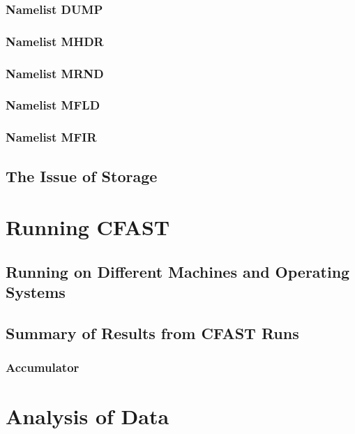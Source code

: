 \documentclass[12pt,twoside]{book}
\begin{document}
\subsection{Namelist DUMP}

\subsection{Namelist MHDR}

\subsection{Namelist MRND}

\subsection{Namelist MFLD}

\subsection{Namelist MFIR}

\section{The Issue of Storage}

%
%

\chapter{Running CFAST}

\section{Running on Different Machines and Operating Systems}

\section{Summary of Results from CFAST Runs}

\subsection{Accumulator}

%
%

\chapter{Analysis of Data}
\end{document}
